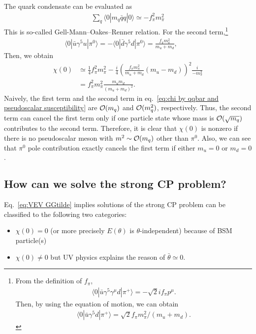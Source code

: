 \documentclass[11pt,a4paper]{article}
\begin{document}
The quark condensate can be evaluated as
\cite{Gell-Mann:1968hlm,Pagels:1974se,Novikov:1977dq}
\begin{align}
    \sum_q \langle 0| m_q \bar q q |0\rangle \simeq -f_\pi^2 m_\pi^2
\end{align}
This is so-called Gell-Mann--Oakes--Renner relation.
For the second term,\footnote{
    From the definition of $f_\pi$, 
    \begin{align}
        \langle 0 | \bar u \gamma^5 \gamma^\mu d | \pi^+\rangle = -\sqrt{2} i f_\pi p^\mu.
    \end{align}
    Then, by using the equation of motion, we can obtain
    \begin{align}
        \langle 0 | \bar u \gamma^5 d | \pi^+\rangle = \sqrt{2} f_\pi m_\pi^2 / (m_u+m_d).
    \end{align}
}
\begin{align}
    \langle 0 | \bar u \gamma^5 u | \pi^0\rangle = - \langle 0 | \bar d \gamma^5 d | \pi^0\rangle = \frac{f_\pi m_\pi^2}{m_u+m_d}, \qquad
\end{align}
Then, we obtain
\begin{align}
    \chi(0)
    &\simeq \frac{1}{4} f_\pi^2 m_\pi^2 -\frac{i}{4} \left( \frac{f_\pi m_\pi^2}{m_u+m_d}(m_u-m_d) \right)^2 \frac{i}{-m_\pi^2} \nonumber\\
    &= f_\pi^2 m_\pi^2 \frac{m_u m_d}{(m_u+m_d)^2}.
\end{align}
Naively, the first term and the second term in eq.~\eqref{eq:chi by qqbar and pseudoscalar susceptibility} are ${\cal O}(m_q)$ and ${\cal O}(m_q^2)$, respectively. Thus, the second term can cancel the first term only if one particle state whose mass is ${\cal O}(\sqrt{m_q})$ contributes to the second term.
Therefore, it is clear that $\chi(0)$ is nonzero if there is no pseudoscalar meson with $m^2 \sim {\cal O}(m_q)$ other than $\pi^0$.
Also, we can see that $\pi^0$ pole contribution exactly cancels the first term if either $m_u=0$ or $m_d=0$.


\subsection{How can we solve the strong CP problem?}
Eq.~\eqref{eq:VEV GGtilde} implies solutions of the strong CP problem can be classified to the following two categories:
\begin{itemize}
    \item $\chi(0) = 0$ (or more precisely $E(\theta)$ is $\theta$-independent) because of BSM particle(s)
    \item $\chi(0) \neq 0$ but UV physics explains the reason of $\bar\theta \simeq 0$.
\end{itemize}
\end{document}
